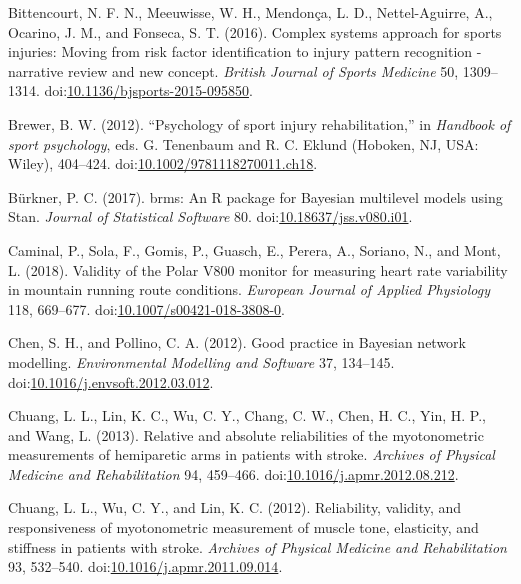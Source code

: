 \documentclass[utf8]{frontiersHLTH}
\begin{document}
\leavevmode\hypertarget{ref-Bittencourt2016}{}%
Bittencourt, N. F. N., Meeuwisse, W. H., Mendonça, L. D.,
Nettel-Aguirre, A., Ocarino, J. M., and Fonseca, S. T. (2016). Complex
systems approach for sports injuries: Moving from risk factor
identification to injury pattern recognition - narrative review and new
concept. \emph{British Journal of Sports Medicine} 50, 1309--1314.
doi:\href{https://doi.org/10.1136/bjsports-2015-095850}{10.1136/bjsports-2015-095850}.

\leavevmode\hypertarget{ref-Brewer2012}{}%
Brewer, B. W. (2012). ``Psychology of sport injury rehabilitation,'' in
\emph{Handbook of sport psychology}, eds. G. Tenenbaum and R. C. Eklund
(Hoboken, NJ, USA: Wiley), 404--424.
doi:\href{https://doi.org/10.1002/9781118270011.ch18}{10.1002/9781118270011.ch18}.

\leavevmode\hypertarget{ref-Burkner2017a}{}%
Bürkner, P. C. (2017). brms: An R package for Bayesian multilevel models
using Stan. \emph{Journal of Statistical Software} 80.
doi:\href{https://doi.org/10.18637/jss.v080.i01}{10.18637/jss.v080.i01}.

\leavevmode\hypertarget{ref-Caminal2018}{}%
Caminal, P., Sola, F., Gomis, P., Guasch, E., Perera, A., Soriano, N.,
and Mont, L. (2018). Validity of the Polar V800 monitor for measuring
heart rate variability in mountain running route conditions.
\emph{European Journal of Applied Physiology} 118, 669--677.
doi:\href{https://doi.org/10.1007/s00421-018-3808-0}{10.1007/s00421-018-3808-0}.

\leavevmode\hypertarget{ref-Chen2012}{}%
Chen, S. H., and Pollino, C. A. (2012). Good practice in Bayesian
network modelling. \emph{Environmental Modelling and Software} 37,
134--145.
doi:\href{https://doi.org/10.1016/j.envsoft.2012.03.012}{10.1016/j.envsoft.2012.03.012}.

\leavevmode\hypertarget{ref-Chuang2013}{}%
Chuang, L. L., Lin, K. C., Wu, C. Y., Chang, C. W., Chen, H. C., Yin, H.
P., and Wang, L. (2013). Relative and absolute reliabilities of the
myotonometric measurements of hemiparetic arms in patients with stroke.
\emph{Archives of Physical Medicine and Rehabilitation} 94, 459--466.
doi:\href{https://doi.org/10.1016/j.apmr.2012.08.212}{10.1016/j.apmr.2012.08.212}.

\leavevmode\hypertarget{ref-Chuang2012}{}%
Chuang, L. L., Wu, C. Y., and Lin, K. C. (2012). Reliability, validity,
and responsiveness of myotonometric measurement of muscle tone,
elasticity, and stiffness in patients with stroke. \emph{Archives of
Physical Medicine and Rehabilitation} 93, 532--540.
doi:\href{https://doi.org/10.1016/j.apmr.2011.09.014}{10.1016/j.apmr.2011.09.014}.
\end{document}
